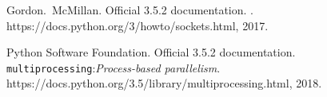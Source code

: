 \documentclass{beamer}
\newcommand{\code}[1]{\texttt{#1}}
\begin{document}
\begin{frame}[allowframebreaks]
\begin{thebibliography}{10}
                \beamertemplateonlinebibitems
                Gordon.~McMillan.
                \newblock Official 3.5.2 documentation.
                .
                \newblock https://docs.python.org/3/howto/sockets.html, 2017.

                \beamertemplateonlinebibitems
                Python Software Foundation.
                \newblock Official 3.5.2 documentation.
                \newblock \code{multiprocessing}:{\em Process-based parallelism}.
                \newblock https://docs.python.org/3.5/library/multiprocessing.html, 2018.

            \end{thebibliography}
          \end{frame}
    
\end{document}
